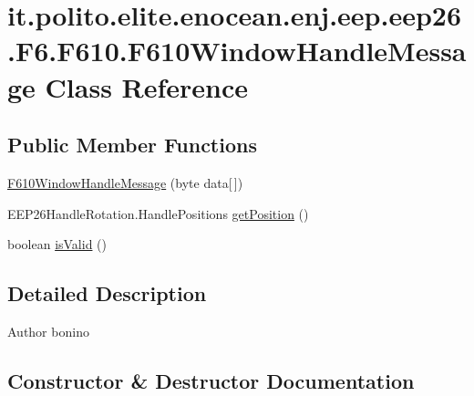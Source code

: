 \hypertarget{classit_1_1polito_1_1elite_1_1enocean_1_1enj_1_1eep_1_1eep26_1_1_f6_1_1_f610_1_1_f610_window_handle_message}{}\section{it.\+polito.\+elite.\+enocean.\+enj.\+eep.\+eep26.\+F6.\+F610.\+F610\+Window\+Handle\+Message Class Reference}
\label{classit_1_1polito_1_1elite_1_1enocean_1_1enj_1_1eep_1_1eep26_1_1_f6_1_1_f610_1_1_f610_window_handle_message}
\subsection*{Public Member Functions}
\begin{DoxyCompactItemize}
\item 
\hyperlink{classit_1_1polito_1_1elite_1_1enocean_1_1enj_1_1eep_1_1eep26_1_1_f6_1_1_f610_1_1_f610_window_handle_message_af56c9333285b532b100486fc074c8ea5}{F610\+Window\+Handle\+Message} (byte data\mbox{[}$\,$\mbox{]})
\item 
E\+E\+P26\+Handle\+Rotation.\+Handle\+Positions \hyperlink{classit_1_1polito_1_1elite_1_1enocean_1_1enj_1_1eep_1_1eep26_1_1_f6_1_1_f610_1_1_f610_window_handle_message_abc27e79ba739e02b71fe49f1edaba01b}{get\+Position} ()
\item 
boolean \hyperlink{classit_1_1polito_1_1elite_1_1enocean_1_1enj_1_1eep_1_1eep26_1_1_f6_1_1_f610_1_1_f610_window_handle_message_ad6cfb1d1fcdc8d229ba87cd783cc3279}{is\+Valid} ()
\end{DoxyCompactItemize}


\subsection{Detailed Description}
\begin{DoxyAuthor}{Author}
bonino 
\end{DoxyAuthor}


\subsection{Constructor \& Destructor Documentation}
\hypertarget{classit_1_1polito_1_1elite_1_1enocean_1_1enj_1_1eep_1_1eep26_1_1_f6_1_1_f610_1_1_f610_window_handle_message_af56c9333285b532b100486fc074c8ea5}{}\label{classit_1_1polito_1_1elite_1_1enocean_1_1enj_1_1eep_1_1eep26_1_1_f6_1_1_f610_1_1_f610_window_handle_message_af56c9333285b532b100486fc074c8ea5} 
